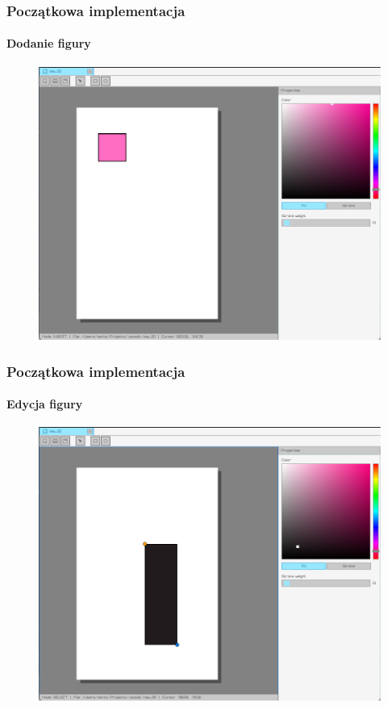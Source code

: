 \documentclass[
	11pt,]{beamer}
\begin{document}
\begin{frame}
	\frametitle{Początkowa implementacja}
	\framesubtitle{Dodanie figury}
	
	\begin{figure}
		\includegraphics[height=0.7\textheight]{figures/pro3.png}
	\end{figure}
\end{frame}

\begin{frame}
	\frametitle{Początkowa implementacja}
	\framesubtitle{Edycja figury}
	
	\begin{figure}
		\includegraphics[height=0.7\textheight]{figures/pro4.png}
	\end{figure}
\end{frame}
\end{document}
